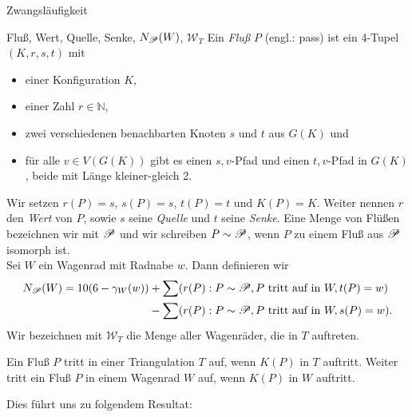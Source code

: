 \begin{section}{Zwangsläufigkeit}
 \begin{definition}{Fluß, Wert, Quelle, Senke, $N_{\mathscr{P}}(W)$, $\mathscr{W}_T$}
  Ein \textit{Fluß} $P$ (engl.: pass) ist ein 4-Tupel $(K,r,s,t)$ mit
  \begin{itemize}
   \item einer Konfiguration $K$,
   \item einer Zahl $r \in \mathbb{N}$,
   \item zwei verschiedenen benachbarten Knoten $s$ und $t$ aus $G(K)$ und
   \item für alle $v \in V(G(K))$ gibt es einen $s,v$-Pfad und einen $t,v$-Pfad in $G(K)$, beide mit Länge kleiner-gleich 2.
  \end{itemize}
  Wir setzen $r(P) = s$, $s(P) = s$, $t(P) = t$ und $K(P) = K$. Weiter nennen $r$ den \textit{Wert} von $P$, sowie $s$ seine \textit{Quelle} und $t$ seine \textit{Senke}. Eine Menge von Flüßen bezeichnen wir mit $\mathscr{P}$ und wir schreiben $P \sim \mathscr{P}$, wenn $P$ zu einem Fluß aus $\mathscr{P}$ isomorph ist. \\
  Sei $W$ ein Wagenrad mit Radnabe $w$. Dann definieren wir\\
  \begin{align*}
     N_{\mathscr{P}}(W) = 10(6-\gamma_W(w)) &+ \sum (r(P) : P \sim \mathscr{P}, P \text{ tritt auf in } W, t(P)=w)\\
					  &- \sum (r(P) : P \sim \mathscr{P}, P \text{ tritt auf in } W, s(P)=w)\text{.}
  \end{align*}
  Wir bezeichnen mit $\mathscr{W}_T$ die Menge aller Wagenräder, die in $T$ auftreten. 
 \end{definition}
 
  
 Ein Fluß $P$ tritt in einer Triangulation $T$ auf, wenn $K(P)$ in $T$ auftritt. Weiter tritt ein Fluß $P$ in einem Wagenrad $W$ auf, wenn $K(P)$ in $W$ auftritt.
 
 Dies führt uns zu folgendem Resultat:
 

\end{section}
